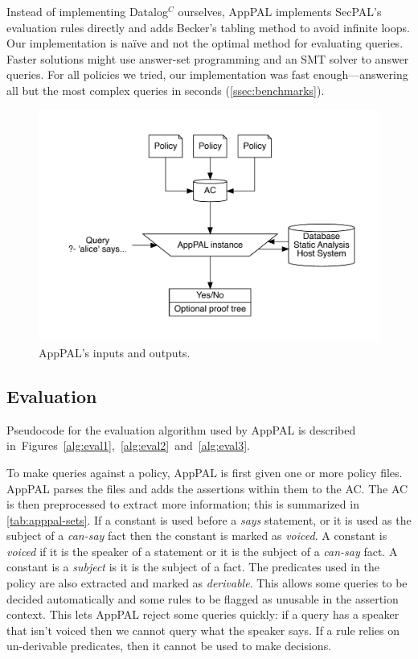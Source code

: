 \documentclass[thesis.tex]{subfiles}
\begin{document}
Instead of implementing Datalog$^C$ ourselves, AppPAL implements
SecPAL's evaluation rules directly and adds Becker's tabling
method to avoid infinite loops. Our implementation is na\"ive and not
the optimal method for evaluating queries. Faster solutions might use
answer-set programming and an SMT solver to answer queries. For all
policies we tried, our implementation was fast enough---answering all
but the most complex queries in seconds (\autoref{ssec:benchmarks}).


\begin{figure}
  \centering
  \includegraphics[width=\linewidth]{figures/apppal-evaluation.pdf}
  \caption{AppPAL's inputs and outputs.}
  \label{fig:apppal-inputs-outputs}
\end{figure}

\subsection{Evaluation}
\label{ssec:evaluation-alg}

Pseudocode for the evaluation algorithm used by AppPAL is described
in~Figures~\ref{alg:eval1},~\ref{alg:eval2}~and~\ref{alg:eval3}.

To make queries against a policy, AppPAL is first given one or more policy files.
AppPAL parses the files and adds the assertions within them to the \ac{AC}. The
AC is then preprocessed to extract more information; this is summarized in
\autoref{tab:apppal-sets}. If a constant is used before a \emph{says} statement,
or it is used as the subject of a \emph{can-say} fact then the constant is
marked as \emph{voiced}. A constant is \emph{voiced} if it is the speaker of a
statement or it is the subject of a \emph{can-say} fact. A constant is a
\emph{subject} is it is the subject of a fact. The predicates used in the policy
are also extracted and marked as \emph{derivable}. This allows some queries to
be decided automatically and some rules to be flagged as unusable in the
assertion context. This lets AppPAL reject some queries quickly: if a query has
a speaker that isn't voiced then we cannot query what the speaker says. If a
rule relies on un-derivable predicates, then it cannot be used to make decisions.
\end{document}
